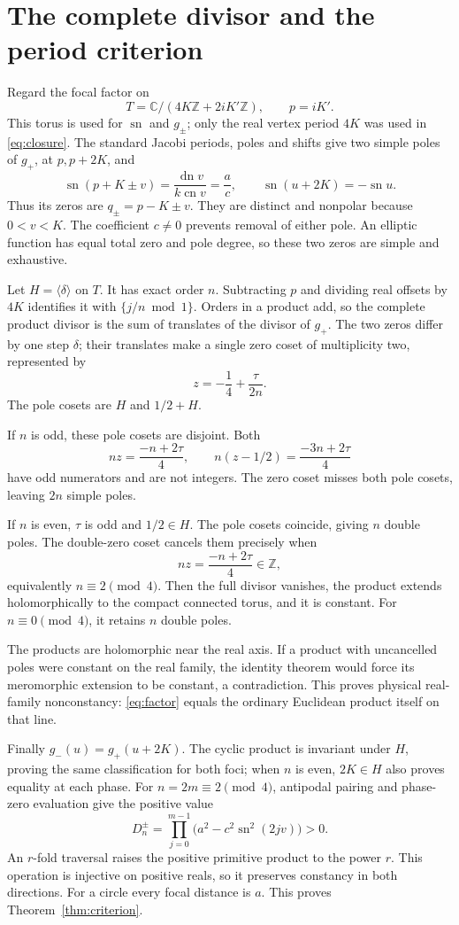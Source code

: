 \documentclass[11pt]{article}
\DeclareMathOperator{\sn}{sn}
\DeclareMathOperator{\cn}{cn}
\DeclareMathOperator{\dn}{dn}
\begin{document}
\section{The complete divisor and the period criterion}
Regard the focal factor on
\[
 T=\mathbb C/(4K\mathbb Z+2iK'\mathbb Z),\qquad p=iK'.
\]
This torus is used for \(\sn\) and \(g_\pm\); only the real vertex
period \(4K\) was used in \eqref{eq:closure}.
The standard Jacobi periods, poles and shifts
\cite[Tables~22.4.1 and 22.4.3]{dlmf} give two simple poles of
\(g_+\), at \(p,p+2K\), and
\[
 \sn(p+K\pm v)=\frac{\dn v}{k\cn v}=\frac ac,\qquad
 \sn(u+2K)=-\sn u.
\]
Thus its zeros are \(q_\pm=p-K\pm v\).
They are distinct and nonpolar because \(0<v<K\).
The coefficient \(c\ne0\) prevents removal of either pole.
An elliptic function has equal total zero and pole degree, so these
two zeros are simple and exhaustive.

Let \(H=\langle\delta\rangle\) on \(T\). It has exact order \(n\).
Subtracting \(p\) and dividing real offsets by \(4K\) identifies
it with \(\{j/n\bmod1\}\).
Orders in a product add, so the complete product divisor is the sum
of translates of the divisor of \(g_+\).
The two zeros differ by one step \(\delta\); their translates make
a single zero coset of multiplicity two, represented by
\[
 z=-\frac14+\frac{\tau}{2n}.
\]
The pole cosets are \(H\) and \(1/2+H\).

If \(n\) is odd, these pole cosets are disjoint. Both
\[
 nz=\frac{-n+2\tau}{4},\qquad
 n(z-1/2)=\frac{-3n+2\tau}{4}
\]
have odd numerators and are not integers. The zero coset misses
both pole cosets, leaving \(2n\) simple poles.

If \(n\) is even, \(\tau\) is odd and \(1/2\in H\).
The pole cosets coincide, giving \(n\) double poles.
The double-zero coset cancels them precisely when
\[
 nz=\frac{-n+2\tau}{4}\in\mathbb Z,
\]
equivalently \(n\equiv2\pmod4\).
Then the full divisor vanishes, the product extends holomorphically
to the compact connected torus, and it is constant.
For \(n\equiv0\pmod4\), it retains \(n\) double poles.

The products are holomorphic near the real axis. If a product with
uncancelled poles were constant on the real family, the identity
theorem would force its meromorphic extension to be constant,
a contradiction. This proves physical real-family nonconstancy:
\eqref{eq:factor} equals the ordinary Euclidean product itself
on that line.

Finally \(g_-(u)=g_+(u+2K)\). The cyclic product is invariant under
\(H\), proving the same classification for both foci; when \(n\)
is even, \(2K\in H\) also proves equality at each phase.
For \(n=2m\equiv2\pmod4\), antipodal pairing and phase-zero evaluation
give the positive value
\[
 D_n^\pm=\prod_{j=0}^{m-1}
 \bigl(a^2-c^2\sn^2(2jv)\bigr)>0.
\]
An \(r\)-fold traversal raises the positive primitive product to
the power \(r\). This operation is injective on positive reals,
so it preserves constancy in both directions.
For a circle every focal distance is \(a\).
This proves Theorem~\ref{thm:criterion}.
\end{document}
